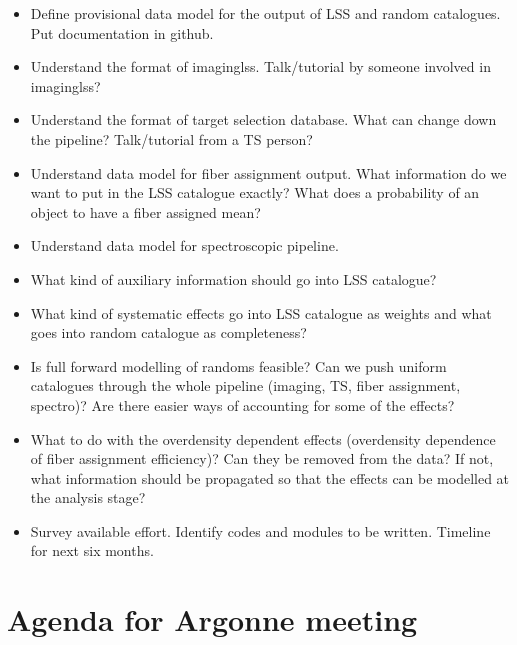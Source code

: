 \documentclass[11pt]{article}
\begin{document}
\begin{itemize}
\item Define provisional data model for the output of LSS and random catalogues.
Put documentation in github.
\item Understand the format of imaginglss. Talk/tutorial by someone involved in
imaginglss?
\item Understand the format of target selection database. What can change down
the pipeline? Talk/tutorial from a TS person?
\item Understand data model for fiber assignment output. What information do we
want to put in the LSS catalogue exactly? What does a probability of an object
to have a fiber assigned mean?
\item Understand data model for spectroscopic pipeline. 
\item What kind of auxiliary information should go into LSS catalogue?
\item What kind of systematic effects go into LSS catalogue as weights and what
goes into random catalogue as completeness?
\item Is full forward modelling of randoms feasible? Can we push uniform
catalogues through the whole pipeline (imaging, TS, fiber assignment, spectro)?
Are there easier ways of accounting for some of the effects?
\item What to do with the overdensity dependent effects (overdensity dependence
of fiber assignment efficiency)? Can they be removed from the data? If not, what
information should be propagated so that the effects can be modelled at the
analysis stage?
\item Survey available effort. Identify codes and modules to be written.
Timeline for next six months.
\end{itemize}

\section{Agenda for Argonne meeting}
\end{document}
